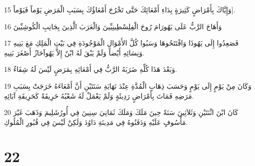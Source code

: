 \par 15 وَإِيَّاكَ بِأَمْرَاضٍ كَثِيرَةٍ بِدَاءِ أَمْعَائِكَ حَتَّى تَخْرُجَ أَمْعَاؤُكَ بِسَبَبِ الْمَرَضِ يَوْماً فَيَوْماً].
\par 16 وَأَهَاجَ الرَّبُّ عَلَى يَهُورَامَ رُوحَ الْفِلِسْطِينِيِّينَ وَالْعَرَبَ الَّذِينَ بِجَانِبِ الْكُوشِيِّينَ
\par 17 فَصَعِدُوا إِلَى يَهُوذَا وَافْتَتَحُوهَا وَسَبُوا كُلَّ الأَمْوَالِ الْمَوْجُودَةِ فِي بَيْتِ الْمَلِكِ مَعَ بَنِيهِ وَنِسَائِهِ أَيْضاً وَلَمْ يَبْقَ لَهُ ابْنٌ إِلاَّ يَهُوآحَازُ أَصْغَرَ بَنِيهِ.
\par 18 وَبَعْدَ هَذَا كُلِّهِ ضَرَبَهُ الرَّبُّ فِي أَمْعَائِهِ بِمَرَضٍ لَيْسَ لَهُ شِفَاءٌ.
\par 19 وَكَانَ مِنْ يَوْمٍ إِلَى يَوْمٍ وَحَسَبَ ذِهَابِ الْمُدَّةِ عِنْدَ نَهَايَةِ سَنَتَيْنِ أَنَّ أَمْعَاءَهُ خَرَجَتْ بِسَبَبِ مَرَضِهِ فَمَاتَ بِأَمْرَاضٍ رَدِيئَةٍ وَلَمْ يَعْمَلْ لَهُ شَعْبُهُ حَرِيقَةً كَحَرِيقَةِ آبَائِهِ.
\par 20 كَانَ ابْنَ اثْنَتَيْنِ وَثَلاَثِينَ سَنَةً حِينَ مَلَكَ وَمَلَكَ ثَمَانِيَ سِنِينَ فِي أُورُشَلِيمَ وَذَهَبَ غَيْرَ مَأْسُوفٍ عَلَيْهِ وَدَفَنُوهُ فِي مَدِينَةِ دَاوُدَ وَلَكِنْ لَيْسَ فِي قُبُورِ الْمُلُوكِ.

\chapter{22}

